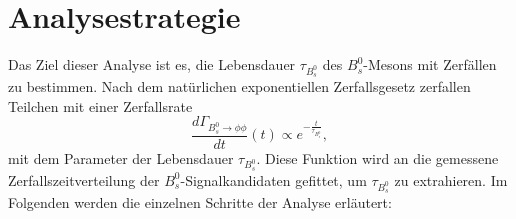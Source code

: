 \documentclass{article}
\begin{document}
\section{Analysestrategie}
Das Ziel dieser Analyse ist es, die Lebensdauer $\tau_{B_s^0}$ des $B_s^0$-Mesons mit Zerfällen zu bestimmen. Nach dem natürlichen exponentiellen Zerfallsgesetz zerfallen Teilchen mit einer Zerfallsrate %
\[\frac{d \Gamma_{B_s^0 \rightarrow \phi\phi}}{dt}(t) \propto e^{-\frac{t}{\tau_{B_s^0}}}, \] mit dem Parameter der Lebensdauer $\tau_{B_s^0}$. Diese Funktion wird an die gemessene Zerfallszeitverteilung der $B_s^0$-Signalkandidaten gefittet, um $\tau_{B_s^0}$ zu extrahieren. %
Im Folgenden werden die einzelnen Schritte der Analyse erläutert:
\end{document}
